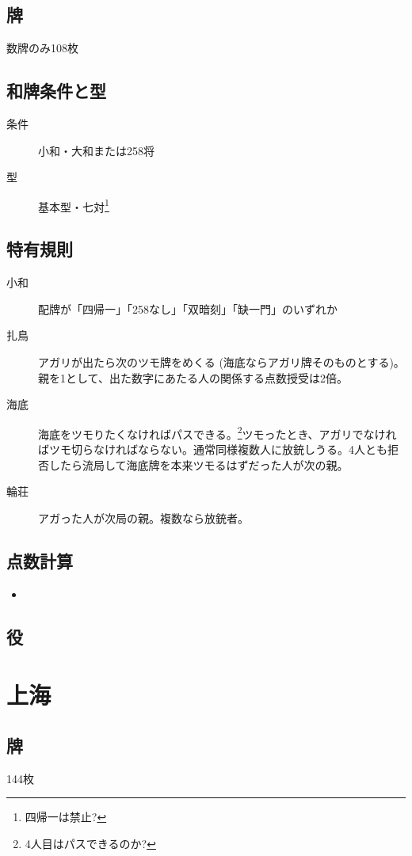 \documentclass{ltjsarticle}
\begin{document}
\subsection{牌}数牌のみ108枚
\subsection{和牌条件と型}
\begin{description}
    \item[条件] 小和・大和または258将
    \item[型] 基本型・七対\footnote{四帰一は禁止?}
\end{description}
\subsection{特有規則}
\begin{description}
    \item[小和] 配牌が「四帰一」「258なし」「双暗刻」「缺一門」のいずれか
    \item[扎鳥] アガリが出たら次のツモ牌をめくる (海底ならアガリ牌そのものとする)。親を1として、出た数字にあたる人の関係する点数授受は2倍。
    \item[海底] 海底をツモりたくなければパスできる。\footnote{4人目はパスできるのか?}ツモったとき、アガリでなければツモ切らなければならない。通常同様複数人に放銃しうる。4人とも拒否したら流局して海底牌を本来ツモるはずだった人が次の親。
    \item[輪荘] アガった人が次局の親。複数なら放銃者。
\end{description}
\subsection{点数計算}
\begin{itemize}
    \item
\end{itemize}
\subsection{役}
\begin{description}
    \item[]
\end{description}
\section{上海}
\subsection{牌}144枚
\end{document}
